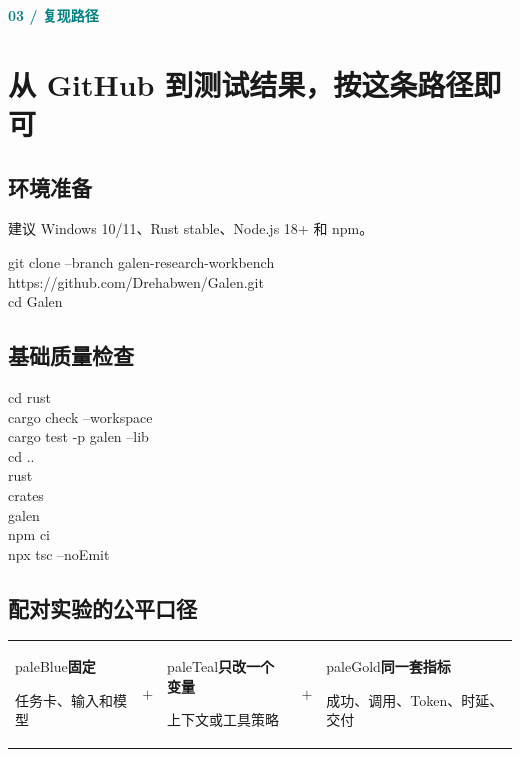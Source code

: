 \documentclass[UTF8,11pt,a4paper]{ctexart}
\newcommand{\kicker}[1]{\textcolor{teal}{\textbf{\small\MakeUppercase{#1}}}\par\vspace{1mm}}
\begin{document}
\kicker{03  /  复现路径}
\section*{从 GitHub 到测试结果，按这条路径即可}
\subsection*{环境准备}
建议 Windows 10/11、Rust stable、Node.js 18+ 和 npm。
\begin{darkbox}\ttfamily\small
git clone --branch galen-research-workbench https://github.com/Drehabwen/Galen.git\\
cd Galen
\end{darkbox}

\subsection*{基础质量检查}
\begin{darkbox}\ttfamily\small
cd rust\\
cargo check --workspace\\
cargo test -p galen --lib\\
cd ..\\rust\\crates\\galen\\
npm ci\\
npx tsc --noEmit
\end{darkbox}

\subsection*{配对实验的公平口径}
\begin{center}
\begin{tabularx}{\textwidth}{@{}X c X c X@{}}
\begin{card}[colframe=blue]{paleBlue}\textbf{固定}\par 任务卡、输入和模型\end{card} & $+$ &
\begin{card}[colframe=teal]{paleTeal}\textbf{只改一个变量}\par 上下文或工具策略\end{card} & $+$ &
\begin{card}[colframe=orange]{paleGold}\textbf{同一套指标}\par 成功、调用、Token、时延、交付\end{card}
\end{tabularx}
\end{center}
\end{document}
